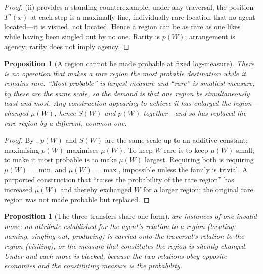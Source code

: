 \documentclass[11pt,a4paper]{article}
\theoremstyle{thmstyle}
\newtheorem{proposition}[theorem]{Proposition}
\theoremstyle{definition}
\theoremstyle{remark}
\begin{document}
\begin{proof}
(ii) provides a standing counterexample: under any traversal,
the position $T^{n}(x)$ at each step is a maximally fine, individually rare
location that no agent located---it is visited, not located. Hence a region can be
as rare as one likes while having been singled out by no one. Rarity is $p(W)$;
arrangement is agency; rarity does not imply agency.
\end{proof}

\begin{proposition}[A region cannot be made probable at fixed log-measure]
\label{prop:cannot-raise}
There is no operation that makes a rare region the most probable destination while
it remains rare. ``Most probable'' is largest measure and ``rare'' is smallest
measure; by  these are the same scale, so the demand is that
one region be simultaneously least and most. Any construction appearing to achieve
it has enlarged the region---changed $\mu(W)$, hence $S(W)$ and $p(W)$ together---and
so has replaced the rare region by a different, common one.
\end{proposition}

\begin{proof}
By , $p(W)$ and $S(W)$ are the same scale up to an additive
constant; maximising $p(W)$ maximises $\mu(W)$. To keep $W$ rare is to keep
$\mu(W)$ small; to make it most probable is to make $\mu(W)$ largest. Requiring
both is requiring $\mu(W)=\min$ and $\mu(W)=\max$, impossible unless the family is
trivial. A purported construction that ``raises the probability of the rare
region'' has increased $\mu(W)$ and thereby exchanged $W$ for a larger region; the
original rare region was not made probable but replaced.
\end{proof}

\begin{proposition}[The three transfers share one form]
\label{prop:one-form}
 are instances of one invalid
move: an attribute established for the agent's relation to a region
\textup{(}locating: naming, singling out, producing\textup{)} is carried onto the
traversal's relation to the region \textup{(}visiting\textup{)}, or the measure
that constitutes the region is silently changed. Under  and
 each move is blocked, because the two relations obey
opposite economies and the constituting measure is the probability.
\end{proposition}
\end{document}

